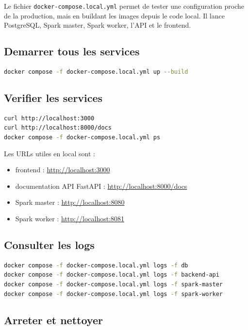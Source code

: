 \documentclass[12pt,a4paper]{article}
\begin{document}
Le fichier \texttt{docker-compose.local.yml} permet de tester une configuration proche de la production, mais en buildant les images depuis le code local.
Il lance PostgreSQL, Spark master, Spark worker, l'API et le frontend.

\subsection{Demarrer tous les services}

\begin{lstlisting}[language=bash]
docker compose -f docker-compose.local.yml up --build
\end{lstlisting}

\subsection{Verifier les services}

\begin{lstlisting}[language=bash]
curl http://localhost:3000
curl http://localhost:8000/docs
docker compose -f docker-compose.local.yml ps
\end{lstlisting}

Les URLs utiles en local sont :

\begin{itemize}
  \item frontend : \url{http://localhost:3000}
  \item documentation API FastAPI : \url{http://localhost:8000/docs}
  \item Spark master : \url{http://localhost:8080}
  \item Spark worker : \url{http://localhost:8081}
\end{itemize}

\subsection{Consulter les logs}

\begin{lstlisting}[language=bash]
docker compose -f docker-compose.local.yml logs -f db
docker compose -f docker-compose.local.yml logs -f backend-api
docker compose -f docker-compose.local.yml logs -f spark-master
docker compose -f docker-compose.local.yml logs -f spark-worker
\end{lstlisting}

\subsection{Arreter et nettoyer}
\end{document}
